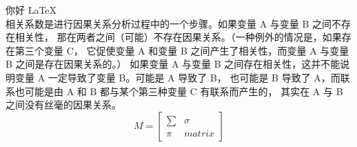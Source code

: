 \documentclass{article}
\begin{document}
你好
\newline
\LaTeX\\

相关系数是进行因果关系分析过程中的一个步骤。如果变量 A 与变量 B 之间不存在相关性，
那在两者之间（可能）不存在因果关系。（一种例外的情况是，如果存在第三个变量 C，
它促使变量 A 和变量 B 之间产生了相关性，而变量 A 与变量 B 之间是存在因果关系的。）
如果变量 A 与变量 B 之间存在相关性，这并不能说明变量 A 一定导致了变量 B。可能是 A 导致了 B，
也可能是 B 导致了 A，而联系也可能是由 A 和 B 都与某个第三种变量 C 有联系而产生的，
其实在 A 与 B 之间没有丝毫的因果关系。
$$
M = 
\begin{bmatrix}
    \sum & \sigma\\
    \pi  & matrix
\end{bmatrix}
$$
\end{document}
